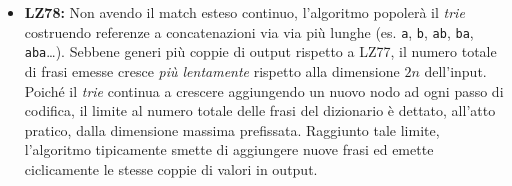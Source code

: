 \begin{enumerate}
\begin{itemize}
    \item \textbf{LZ78:} Non avendo il match esteso continuo, l'algoritmo popolerà il \textit{trie} costruendo referenze a concatenazioni via via più lunghe (es. \texttt{a}, \texttt{b}, \texttt{ab}, \texttt{ba}, \texttt{aba}\dots). Sebbene generi più coppie di output rispetto a LZ77, il numero totale di frasi emesse cresce \textit{più lentamente} rispetto alla dimensione $2n$ dell'input.
    Poiché il \textit{trie} continua a crescere aggiungendo un nuovo nodo ad ogni passo di codifica, il limite al numero totale delle frasi del dizionario è dettato, all'atto pratico, dalla dimensione massima prefissata. Raggiunto tale limite, l'algoritmo tipicamente smette di aggiungere nuove frasi ed emette ciclicamente le stesse coppie di valori in output.

        
    \end{itemize}

\end{enumerate}




